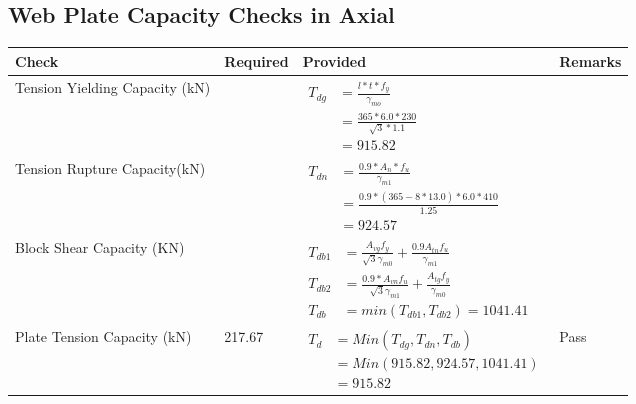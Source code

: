 \documentclass{article}%
\begin{document}
%
\subsection{Web Plate Capacity Checks in Axial}%
\label{subsec:WebPlateCapacityChecksinAxial}%
\renewcommand{\arraystretch}{1.2}%
\begin{longtable}{|p{4cm}|p{6cm}|p{5.5cm}|p{1.5cm}|}%
\hline%
\rowcolor{OsdagGreen}%
Check&Required&Provided&Remarks\\%
\hline%
\endhead%
\hline%
Tension Yielding Capacity (kN)&&$\begin{aligned} T_{dg} &= \frac{l*t*f_y}{\gamma_{mo}}\\ &=\frac{365*6.0*230}{\sqrt{3}*1.1}\\ &=915.82\end{aligned}$&\\%
\hline%
Tension Rupture Capacity(kN)&&$\begin{aligned} T_{dn} &= \frac{0.9*A_{n}*f_u}{\gamma_{m1}}\\ &=\frac{0.9*(365-8*13.0)*6.0*410}{1.25}\\ &=924.57\end{aligned}$&\\%
\hline%
Block Shear Capacity (KN)&&$\begin{aligned}T_{db1} &= \frac{A_{vg} f_{y}}{\sqrt{3} \gamma_{m0}} + \frac{0.9 A_{tn} f_{u}}{\gamma_{m1}}\\ T_{db2} &= \frac{0.9*A_{vn} f_{u}}{\sqrt{3} \gamma_{m1}} + \frac{A_{tg} f_{y}}{\gamma_{m0}}\\ T_{db} &= min(T_{db1}, T_{db2})= 1041.41\end{aligned}$&\\%
\hline%
Plate Tension Capacity (kN)&217.67&$\begin{aligned} T_d &= Min(T_{dg},T_{dn},T_{db})\\ &= Min(915.82,924.57,1041.41)\\ &=915.82\end{aligned}$&Pass\\%
\hline%
\end{longtable}

%
\end{document}
